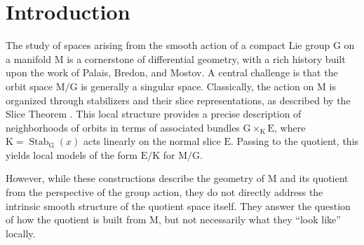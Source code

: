\documentclass[10pt,reqno,letterpaper,twoside]{amsart}
\theoremstyle{article}
\def \E{\mathrm E}
\def \G{\mathrm G}
\def \K{\mathrm K}
\def \M{\mathrm M}
\DeclareMathOperator{\Stab}{Stab}
\begin{document}
  \begin{abstract}
    We investigate the correspondence between the geometry of a smooth action
    of a compact Lie group on a manifold $\M$ and the intrinsic smooth structure
    of the orbit space $\M/\G$. The latter is captured by the \emph{Klein stratification},
    which partitions $\M/\G$ into orbits of local diffeomorphisms, classifying the space
    by its intrinsic singularity types. We show that this geometry maps coherently to
    the quotient through the \emph{isostabilizer decomposition} of $\M$, whose elements
    are the connected components of submanifolds where the stabilizer is constant.
    Our main result, the \emph{Correspondence Theorem}, establishes that the canonical
    projection induces a surjective map from this decomposition to the Klein strata.
    As a corollary, we define the \emph{Inverse Klein Stratification} on $\M$ by pullback,
    clarifying its relationship with the intrinsic geometry of the quotient.
  \end{abstract}
  
  \section*{Introduction}
  
  The study of spaces arising from the smooth action of a compact Lie group $\G$ on a manifold $\M$ is a cornerstone of differential geometry,
  with a rich history built upon the work of Palais, Bredon, and Mostov.
  A central challenge is that the orbit space $\M/\G$ is generally a singular space.
  Classically,
  the action on $\M$ is organized through stabilizers and their slice representations,
  as described by the Slice Theorem \cite{Bre72, Pal60}.
  This local structure provides a precise description of neighborhoods of orbits in terms of associated bundles $\G\times_{\K}\E$,
  where $\K=\Stab_\G(x)$ acts linearly on the normal slice $\E$.
  Passing to the quotient,
  this yields local models of the form $\E/\K$ for $\M/\G$.
  
  However,
  while these constructions describe the geometry of $\M$ and its quotient from the perspective of the group action,
  they do not directly address the intrinsic smooth structure of the quotient space itself.
  They answer the question of how the quotient is built from $\M$,
  but not necessarily what they ``look like'' locally.
  
\end{document}
